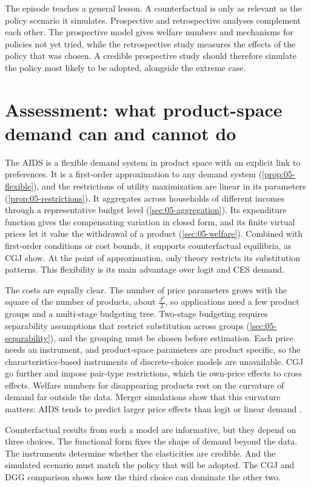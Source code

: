 The episode teaches a general lesson. A counterfactual is only as relevant as the policy scenario it simulates.
Prospective and retrospective analyses complement each other. The prospective model gives welfare numbers and
mechanisms for policies not yet tried, while the retrospective study measures the effects of the policy that was
chosen. A credible prospective study should therefore simulate the policy most likely to be adopted, alongside the
extreme case.

\section{Assessment: what product-space demand can and cannot do}\label{sec:05-assessment}

The AIDS is a flexible demand system in product space with an explicit link to preferences. It is a first-order
approximation to any demand system (\cref{prop:05-flexible}), and the restrictions of utility maximization are linear
in its parameters (\cref{prop:05-restrictions}). It aggregates across households of different incomes through a
representative budget level (\cref{sec:05-aggregation}). Its expenditure function gives the compensating variation in
closed form, and its finite virtual prices let it value the withdrawal of a product (\cref{sec:05-welfare}).
Combined with first-order conditions or cost bounds, it supports counterfactual equilibria, as CGJ show. At the point
of approximation, only theory restricts its substitution patterns. This flexibility is its main advantage over logit
and CES demand.

The costs are equally clear. The number of price parameters grows with the square of the number of products, about
$\frac{J^2}{2}$, so applications need a few product groups and a multi-stage budgeting tree. Two-stage budgeting
requires separability assumptions that restrict substitution across groups (\cref{sec:05-separability}), and the
grouping must be chosen before estimation. Each price needs an instrument, and product-space parameters are product
specific, so the characteristics-based instruments of discrete-choice models are unavailable. CGJ go further and
impose pair-type restrictions, which tie own-price effects to cross effects. Welfare numbers for disappearing products
rest on the curvature of demand far outside the data. Merger simulations show that this curvature matters: AIDS tends
to predict larger price effects than logit or linear demand \citep{CrookeEtAl1999}.

Counterfactual results from such a model are informative, but they depend on three choices. The functional form fixes
the shape of demand beyond the data. The instruments determine whether the elasticities are credible. And the
simulated scenario must match the policy that will be adopted. The CGJ and DGG comparison shows how the third choice
can dominate the other two.

